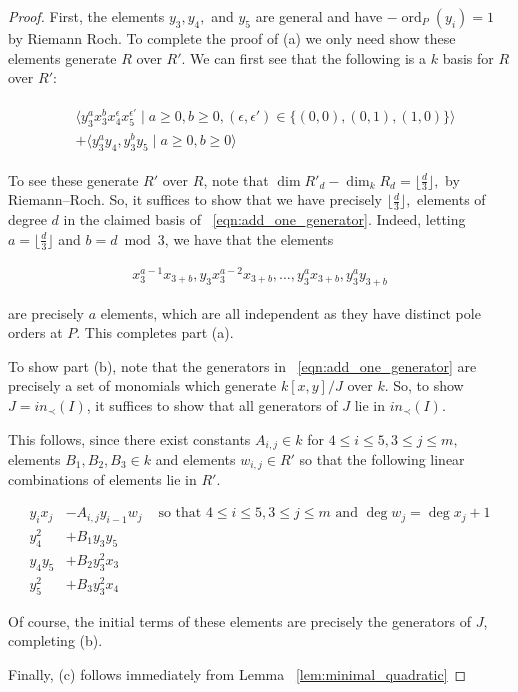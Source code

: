 \documentclass{amsart}
\theoremstyle{plain}
\theoremstyle{definition}
\theoremstyle{remark}
\numberwithin{equation}{section}
\DeclareMathOperator{\ord}{ord}
\begin{document}
\begin{proof}
First, the elements $y_3,y_4,$ and $y_5$ are general and have $-\ord
_P(y_i) = 1$ by Riemann Roch.  To complete the proof of (a) we only need 
show these elements generate $R$ over $R'$. We can first see that 
the following is a $k$ basis for $R$ over $R'$:

\begin{align}
\label{eqn:add_one_generator}
	\begin{split}
		&\langle y_3^ax_3^b x_4^\epsilon x_5^{\epsilon'} \mid a \geq 0, b 
		\geq 0,(\epsilon,\epsilon') \in \{(0,0),(0,1),(1,0)\} \rangle \\
		&+\langle y_3^ay_4,y_3^by_5 \mid a \geq 0, b \geq 0 \rangle
	\end{split}
\end{align}

\noindent
To see these generate $R'$ over $R$, note that $\dim R'_d - \dim_k R
_d = \lfloor \frac{d}{3} \rfloor,$ by Riemann--Roch. So, it
suffices to show that we have precisely $\lfloor \frac{d}{3} \rfloor
,$ elements of degree $d$ in the claimed basis of
~\ref{eqn:add_one_generator}. Indeed, letting $a = \lfloor \frac{d}{3}
\rfloor $ and $b = d \bmod 3$, we have that the elements

\begin{align*}
	x_3^{a-1}x_{3+b},y_3x_3^{a-2}x_{3+b},\ldots, y_3^ax_{3+b},y_3^ay_{
3+b}
\end{align*}

\noindent
are precisely $a$ elements, which are all independent as they have
distinct pole orders at $P$. This completes part (a).

To show part (b), note that the generators in
~\ref{eqn:add_one_generator} are precisely a set of monomials which
generate $k[x,y]/J$ over $k$. So, to show $J = in_\prec(I)$, it
suffices to show that all generators of $J$ lie in $in_\prec(I)$.

This follows, since there exist constants $A_{i,j} \in k$ for $4
\leq i \leq 5,3 \leq j \leq m,$ elements $B_1,B_2,B_3 \in k$ and
elements $w_{i,j} \in R'$ so that the following linear combinations
of elements lie in $R'$.

\begin{align*}
	y_ix_j &- A_{i,j} y_{i-1}w_j & \text{ so that } 4 \leq i \leq 5,3
	\leq j \leq m \text{ and } \deg w_j = \deg x_j + 1\\
	y_4^2 &+ B_1 y_3 y_5 \\
	y_4y_5 &+ B_2 y_3^2 x_3 \\
	y_5^2 &+ B_3 y_3^2 x_4
\end{align*}

\noindent
Of course, the initial terms of these elements are precisely the
generators of $J$, completing (b).

Finally, (c) follows immediately from Lemma ~\ref{lem:minimal_quadratic}
\end{proof}
\end{document}
